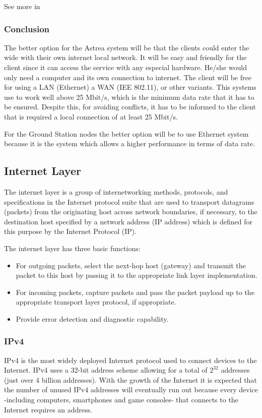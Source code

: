See more in \cite{ATM}

\subsubsection{Conclusion}
The better option for the Astrea system will be that the clients could enter the wide with their own internet local network. It will be easy and friendly for the client since it can access the service with any especial hardware. He/she would only need a computer and its own connection to internet. The client will be free for using a LAN (Ethernet) a WAN (IEE 802.11), or other variants. This systems use to work well above 25 Mbit/s, which is the minimum data rate that it has to be ensured. Despite this, for avoiding conflicts, it has to be informed to the client that is required a local connection of at least 25 Mbit/s.

For the Ground Station nodes the better option will be to use Ethernet system because it is the system which allows a higher performance in terms of data rate.

\subsection{Internet Layer}
The internet layer is a group of internetworking methods, protocols, and specifications in the Internet protocol suite that are used to transport datagrams (packets) from the originating host across network boundaries, if necessary, to the destination host specified by a network address (IP address) which is defined for this purpose by the Internet Protocol (IP). 

The internet layer has three basic functions:
\begin{itemize}
\item For outgoing packets, select the next-hop host (gateway) and transmit the packet to this host by passing it to the appropriate link layer implementation.
\item For incoming packets, capture packets and pass the packet payload up to the appropriate transport layer protocol, if appropriate.
\item Provide error detection and diagnostic capability.
\end{itemize}

\subsubsection{IPv4}
IPv4 is the most widely deployed Internet protocol used to connect devices to the Internet. IPv4 uses a 32-bit address scheme allowing for a total of $ 2^{32} $ addresses (just over 4 billion addresses).  With the growth of the Internet it is expected that the number of unused IPv4 addresses will eventually run out because every device -including computers, smartphones and game consoles- that connects to the Internet requires an address.

